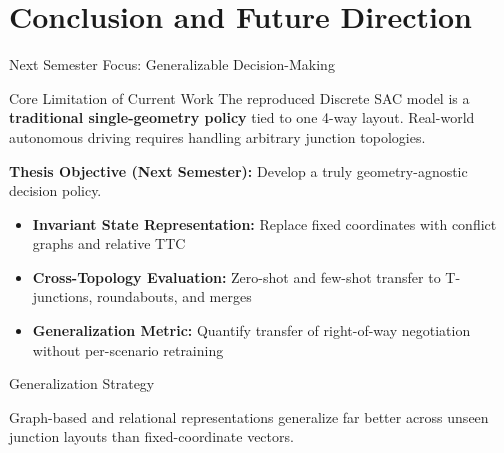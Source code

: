 \documentclass[aspectratio=169,10pt]{beamer}
\begin{document}
\section{Conclusion and Future Direction}

\begin{frame}{Next Semester Focus: Generalizable Decision-Making}
	\begin{alertblock}{Core Limitation of Current Work}
		\small The reproduced Discrete SAC model is a \textbf{traditional single-geometry policy} tied to one 4-way layout. Real-world autonomous driving requires handling arbitrary junction topologies.
	\end{alertblock}
	\vspace{8pt}
	\textbf{Thesis Objective (Next Semester):} Develop a truly geometry-agnostic decision policy.
	\begin{itemize}\setlength{\itemsep}{5pt}
		\item \textbf{Invariant State Representation:} Replace fixed coordinates with conflict graphs and relative TTC
		\item \textbf{Cross-Topology Evaluation:} Zero-shot and few-shot transfer to T-junctions, roundabouts, and merges
		\item \textbf{Generalization Metric:} Quantify transfer of right-of-way negotiation without per-scenario retraining
	\end{itemize}
\end{frame}

\begin{frame}{Generalization Strategy}
	\centering
	\vspace{16pt}

	\small Graph-based and relational representations generalize far better across unseen junction layouts than fixed-coordinate vectors.
\end{frame}
\end{document}
